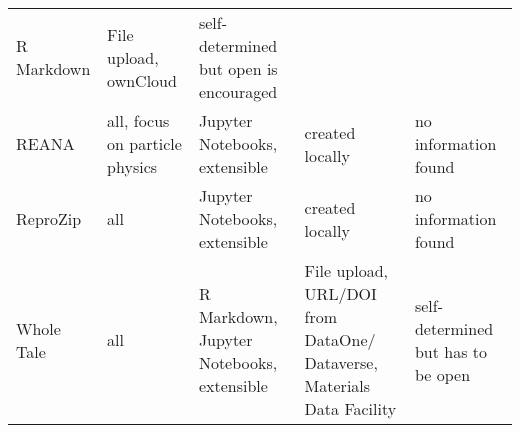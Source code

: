 \documentclass[onecolumn]{article}
\begin{document}
\begin{longtable}[]{@{}lllll@{}}
\begin{minipage}[t]{0.21\columnwidth}
R Markdown\strut
\end{minipage} & \begin{minipage}[t]{0.21\columnwidth}\raggedright
File upload, ownCloud\strut
\end{minipage} & \begin{minipage}[t]{0.21\columnwidth}\raggedright
self-determined but open is encouraged\strut
\end{minipage}\tabularnewline
\begin{minipage}[t]{0.11\columnwidth}\raggedright
REANA\strut
\end{minipage} & \begin{minipage}[t]{0.11\columnwidth}\raggedright
all, focus on particle physics\strut
\end{minipage} & \begin{minipage}[t]{0.21\columnwidth}\raggedright
Jupyter Notebooks, extensible\strut
\end{minipage} & \begin{minipage}[t]{0.21\columnwidth}\raggedright
created locally\strut
\end{minipage} & \begin{minipage}[t]{0.21\columnwidth}\raggedright
no information found\strut
\end{minipage}\tabularnewline
\begin{minipage}[t]{0.11\columnwidth}\raggedright
ReproZip\strut
\end{minipage} & \begin{minipage}[t]{0.11\columnwidth}\raggedright
all\strut
\end{minipage} & \begin{minipage}[t]{0.21\columnwidth}\raggedright
Jupyter Notebooks, extensible\strut
\end{minipage} & \begin{minipage}[t]{0.21\columnwidth}\raggedright
created locally\strut
\end{minipage} & \begin{minipage}[t]{0.21\columnwidth}\raggedright
no information found\strut
\end{minipage}\tabularnewline
\begin{minipage}[t]{0.11\columnwidth}\raggedright
Whole Tale\strut
\end{minipage} & \begin{minipage}[t]{0.11\columnwidth}\raggedright
all\strut
\end{minipage} & \begin{minipage}[t]{0.21\columnwidth}\raggedright
R Markdown, Jupyter Notebooks, extensible\strut
\end{minipage} & \begin{minipage}[t]{0.21\columnwidth}\raggedright
File upload, URL/DOI from DataOne/ Dataverse, Materials Data
Facility\strut
\end{minipage} & \begin{minipage}[t]{0.21\columnwidth}\raggedright
self-determined but has to be open\strut
\end{minipage}\tabularnewline
\bottomrule
\end{longtable}
\end{document}
